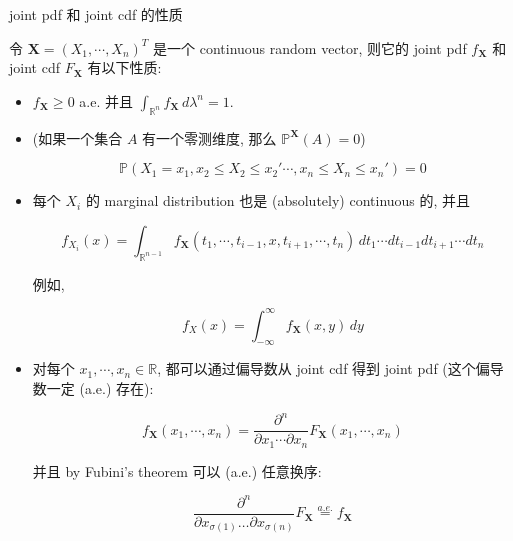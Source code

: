 \documentclass{qlnotes-export}
\begin{document}
\begin{proposition}{joint pdf 和 joint cdf 的性质}\label{prop-03-joint-conditional-distribution-joint-pdf-joint-cdf}

令 \(\mathbf{X} = (X_{1},\cdots,X_{n})^{T}\) 是一个 continuous random vector, 则它的 joint pdf \(f_{\mathbf{X}}\) 和 joint cdf \(F_{\mathbf{X}}\) 有以下性质:

\begin{itemize}
\item
  \(f_{\mathbf{X}} \geq 0\) a.e. 并且 \(\int_{{\mathbb{R}}^{n}}f_{\mathbf{X}}\, d\lambda^{n} = 1\).
\item
  (如果一个集合 \(A\) 有一个零测维度, 那么 \({\mathbb{P}}^{\mathbf{X}}(A) = 0\))

  \[{\mathbb{P}}(X_{1} = x_{1},x_{2} \leq X_{2} \leq x_{2}'\cdots,x_{n} \leq X_{n} \leq x_{n}') = 0\]
\item
  每个 \(X_{i}\) 的 marginal distribution 也是 (absolutely) continuous 的, 并且

  \[f_{X_{i}}(x) = \int_{{\mathbb{R}}^{n - 1}}f_{\mathbf{X}}(t_{1},\cdots,t_{i - 1},x,t_{i + 1},\cdots,t_{n})\, dt_{1}\cdots dt_{i - 1}dt_{i + 1}\cdots dt_{n}\]

  例如,

  \[f_{X}(x) = \int_{- \infty}^{\infty}f_{\mathbf{X}}(x,y)\, dy\]
\item
  对每个 \(x_{1},\cdots,x_{n} \in {\mathbb{R}}\), 都可以通过偏导数从 joint cdf 得到 joint pdf (这个偏导数一定 (a.e.) 存在):

  \[f_{\mathbf{X}}(x_{1},\cdots,x_{n}) = \frac{\partial^{n}}{\partial x_{1}\cdots\partial x_{n}}F_{\mathbf{X}}(x_{1},\cdots,x_{n})\]

  并且 by Fubini's theorem 可以 (a.e.) 任意换序:

  \[\frac{\partial^{n}}{\partial x_{\sigma(1)}\ldots\partial x_{\sigma(n)}}F_{\mathbf{X}}\overset{a.e.}{=}f_{\mathbf{X}}\]
\end{itemize}

\end{proposition}
\end{document}
